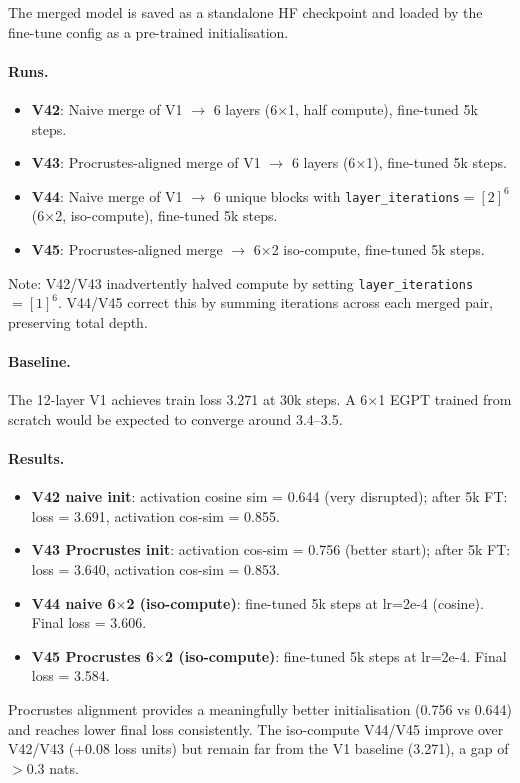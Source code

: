 The merged model is saved as a standalone HF checkpoint and loaded by the fine-tune
config as a pre-trained initialisation.

\paragraph{Runs.}
\begin{itemize}
  \item \textbf{V42}: Naive merge of V1 $\to$ 6 layers (6$\times$1, half compute), fine-tuned 5k steps.
  \item \textbf{V43}: Procrustes-aligned merge of V1 $\to$ 6 layers (6$\times$1), fine-tuned 5k steps.
  \item \textbf{V44}: Naive merge of V1 $\to$ 6 unique blocks with \texttt{layer\_iterations}$=[2]^6$
        (6$\times$2, iso-compute), fine-tuned 5k steps.
  \item \textbf{V45}: Procrustes-aligned merge $\to$ 6$\times$2 iso-compute, fine-tuned 5k steps.
\end{itemize}
Note: V42/V43 inadvertently halved compute by setting \texttt{layer\_iterations}$=[1]^6$.
V44/V45 correct this by summing iterations across each merged pair, preserving total depth.

\paragraph{Baseline.}
The 12-layer V1 achieves train loss 3.271 at 30k steps.
A 6$\times$1 EGPT trained from scratch would be expected to converge around 3.4--3.5.

\paragraph{Results.}
\begin{itemize}
  \item \textbf{V42 naive init}: activation cosine sim = 0.644 (very disrupted);
        after 5k FT: loss = 3.691, activation cos-sim = 0.855.
  \item \textbf{V43 Procrustes init}: activation cos-sim = 0.756 (better start);
        after 5k FT: loss = 3.640, activation cos-sim = 0.853.
  \item \textbf{V44 naive 6$\times$2 (iso-compute)}: fine-tuned 5k steps at lr=2e-4 (cosine).
        Final loss = 3.606.
  \item \textbf{V45 Procrustes 6$\times$2 (iso-compute)}: fine-tuned 5k steps at lr=2e-4.
        Final loss = 3.584.
\end{itemize}
Procrustes alignment provides a meaningfully better initialisation (0.756 vs 0.644)
and reaches lower final loss consistently.
The iso-compute V44/V45 improve over V42/V43 (+0.08 loss units) but remain far from
the V1 baseline (3.271), a gap of $>0.3$ nats.

